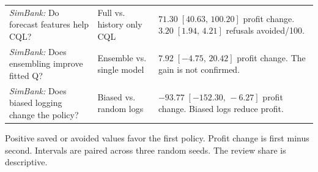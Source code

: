\begin{table}[!t]
\begin{tabularx}{\textwidth}{@{}L{2.35in}L{1.55in}Y@{}}
\textit{SimBank:} Do forecast features help CQL? & Full vs. history only CQL & $71.30\;[40.63,\,100.20]$ profit change. $3.20\;[1.94,\,4.21]$ refusals avoided/100. \\
\textit{SimBank:} Does ensembling improve fitted Q? & Ensemble vs. single model & $7.92\;[-4.75,\,20.42]$ profit change. The gain is not confirmed. \\
\textit{SimBank:} Does biased logging change the policy? & Biased vs. random logs & $-93.77\;[-152.30,\,-6.27]$ profit change. Biased logs reduce profit. \\
\bottomrule
\end{tabularx}
\par\smallskip
\begin{minipage}{\textwidth}\fontsize{6.5}{7.1}\selectfont
Positive saved or avoided values favor the first policy. Profit change is first minus second. Intervals are paired across three random seeds. The review share is descriptive.
\end{minipage}
\end{table}
